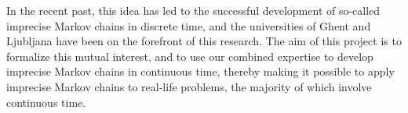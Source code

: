 \documentclass[11pt,dvipsnames,usenames,a4paper]{article}
\begin{document}
In the recent past, this idea has led to the successful development of so-called imprecise Markov chains in discrete time, and the universities of Ghent and Ljubljana have been on the forefront of this research. The aim of this project is to formalize this mutual interest, and to use our combined expertise to develop imprecise Markov chains in continuous time, thereby making it possible to apply imprecise Markov chains to real-life problems, the majority of which involve continuous time.








\end{document}
